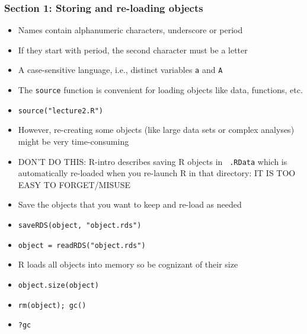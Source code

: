 \documentclass[11pt,pdftex,dvipsnames,usenames,helvetica]{beamer}
\begin{document}
\begin{frame} 
\frametitle{Section 1: Storing and re-loading objects}

\begin{itemize}
\item Names contain alphanumeric characters, underscore or period
\item If they start with period, the second character must be a letter
\item A case-sensitive language, i.e., distinct variables {\tt a} and {\tt A}
\item The {\tt source} function is convenient for loading objects like
data, functions, etc.
\item {\tt source("lecture2.R")}
\item However, re-creating some objects (like large data sets or
  complex analyses) might be very time-consuming
\item DON'T DO THIS: R-intro describes saving R objects in {\tt
    .RData} which is automatically re-loaded when you re-launch R in
  that directory: IT IS TOO EASY TO FORGET/MISUSE
\item Save the objects that you want to keep and re-load as needed
\item {\tt saveRDS(object, "object.rds")}
\item {\tt object = readRDS("object.rds")}
\item R loads all objects into memory so be cognizant of their size
\item {\tt object.size(object)}
\item {\tt rm(object); gc()}
\item {\tt ?gc}
\end{itemize} 

\end{frame}
\end{document}
